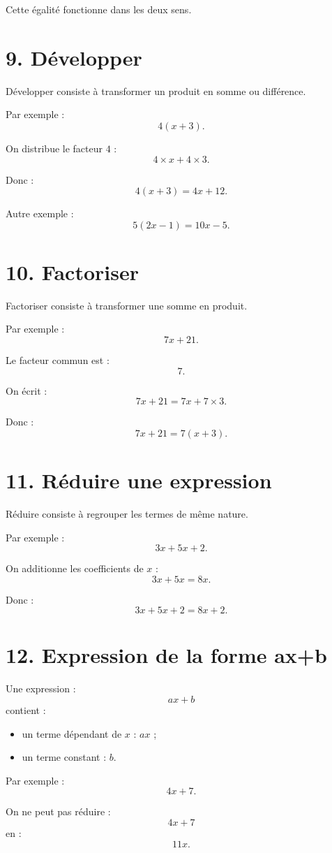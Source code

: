 Cette égalité fonctionne dans les deux sens.

\section{9. Développer}

Développer consiste à transformer un produit en somme ou différence.

Par exemple :
\[
4(x+3).
\]

On distribue le facteur $4$ :
\[
4\times x+4\times3.
\]

Donc :
\[
\boxed{4(x+3)=4x+12}.
\]

Autre exemple :
\[
5(2x-1)
=
10x-5.
\]

\section{10. Factoriser}

Factoriser consiste à transformer une somme en produit.

Par exemple :
\[
7x+21.
\]

Le facteur commun est :
\[
7.
\]

On écrit :
\[
7x+21
=
7x+7\times3.
\]

Donc :
\[
\boxed{7x+21=7(x+3)}.
\]

\section{11. Réduire une expression}

Réduire consiste à regrouper les termes de même nature.

Par exemple :
\[
3x+5x+2.
\]

On additionne les coefficients de $x$ :
\[
3x+5x=8x.
\]

Donc :
\[
\boxed{3x+5x+2=8x+2}.
\]

\section{12. Expression de la forme ax+b}

Une expression :
\[
ax+b
\]
contient :
\begin{itemize}
\item un terme dépendant de $x$ : $ax$ ;
\item un terme constant : $b$.
\end{itemize}

Par exemple :
\[
4x+7.
\]

On ne peut pas réduire :
\[
4x+7
\]
en :
\[
11x.
\]

